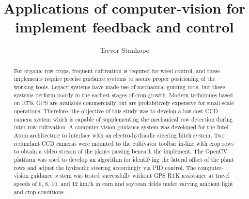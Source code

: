 \documentclass{article}
\begin{document}
\title{Applications of computer-vision for implement feedback and
  control}
\author{Trevor Stanhope}
\maketitle
\begin{abstract}
For organic row crops, frequent cultivation is required for weed
control, and these implements require precise guidance systems to
assure proper positioning of the working tools.
Legacy systems have made use of mechanical guiding rods, but these
systems perform poorly in the earliest stages of crop growth.
Modern techniques based on RTK GPS are available commercially but are
prohibitively expensive for small-scale operations.
Therefore, the objective of this study was to develop a low-cost CCD camera system which is capable of supplementing the mechanical row detection during inter-row cultivation.
A computer-vision guidance system was developed for the Intel Atom architecture to interface with an electro-hydraulic steering hitch system.
Two redundant CCD cameras were mounted to the cultivator toolbar
in-line with crop rows to obtain a video stream of the plants passing beneath the implement.
The OpenCV platform was used to develop an algorithm for identifying
the lateral offset of the plant rows and adjust the hydraulic steering
accordingly via PID control.
The computer-vision guidance system was tested successfully without GPS RTK assistance at travel speeds of 6, 8, 10, and 12 km/h in corn and soybean fields under varying ambient light and crop conditions. 
\end{abstract}
\end{document}
